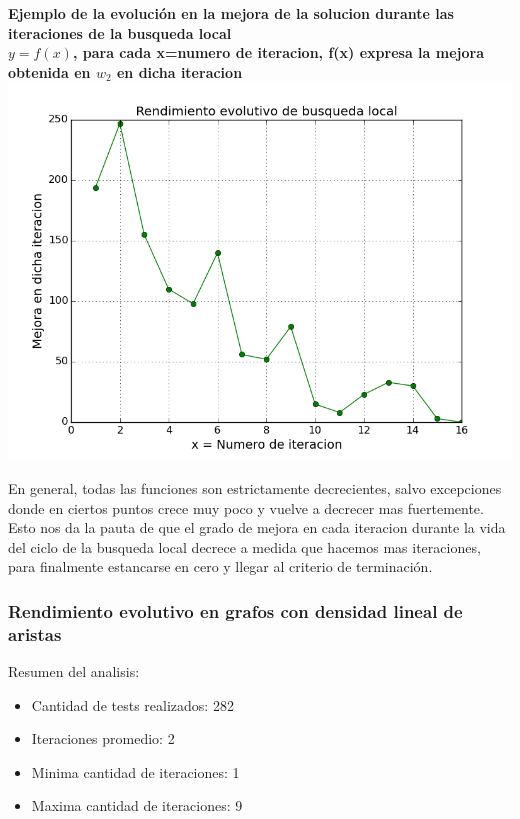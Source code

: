 \begin{center}
	\textbf{Ejemplo de la evoluci\'on en la mejora de la solucion durante las iteraciones de la busqueda local}\\
	\textbf{$y = f(x)$, para cada x=numero de iteracion, f(x) expresa la mejora obtenida en $w_2$ en dicha iteracion}\\
	\includegraphics[scale=0.7]{experimentos/bqlocal/rendimiento_evolucion_iteraciones_cliques/test-results/bqlocal/instancia_120_7130_in_iters.png}
\end{center}

En general, todas las funciones son estrictamente decrecientes, salvo excepciones donde en ciertos puntos crece muy poco y vuelve a decrecer mas fuertemente. Esto nos da la pauta de que el grado de mejora en cada iteracion durante la vida del ciclo de la busqueda local decrece a medida que hacemos mas iteraciones, para finalmente estancarse en cero y llegar al criterio de terminaci\'on.

\subsubsection{Rendimiento evolutivo en grafos con densidad lineal de aristas}

Resumen del analisis:
\begin{itemize}
	\item Cantidad de tests realizados: 282
	\item Iteraciones promedio: 2
	\item Minima cantidad de iteraciones: 1
	\item Maxima cantidad de iteraciones: 9
\end{itemize}

